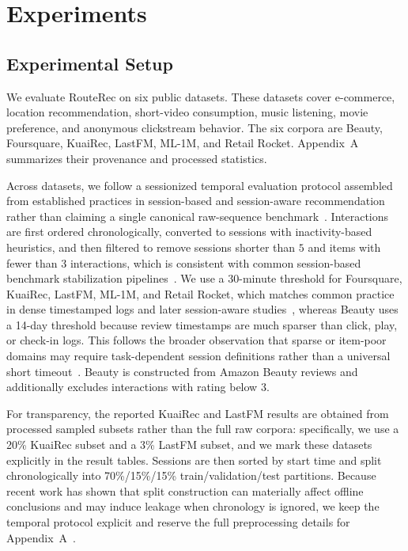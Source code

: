 \documentclass[sigconf,review,anonymous]{acmart}
\begin{document}
\section{Experiments}
\label{sec:experiments}


\subsection{Experimental Setup}
We evaluate RouteRec on six public datasets. These datasets cover e-commerce, location recommendation, short-video consumption, music listening, movie preference, and anonymous clickstream behavior. The six corpora are Beauty, Foursquare, KuaiRec, LastFM, ML-1M, and Retail Rocket. Appendix~A summarizes their provenance and processed statistics.

Across datasets, we follow a sessionized temporal evaluation protocol assembled from established practices in session-based and session-aware recommendation rather than claiming a single canonical raw-sequence benchmark~\cite{jannach2022sessions,quadrana2017hrnn,latifi2021sessionaware}. Interactions are first ordered chronologically, converted to sessions with inactivity-based heuristics, and then filtered to remove sessions shorter than $5$ and items with fewer than $3$ interactions, which is consistent with common session-based benchmark stabilization pipelines~\cite{li2017narm,wu2019srgnn}. We use a 30-minute threshold for Foursquare, KuaiRec, LastFM, ML-1M, and Retail Rocket, which matches common practice in dense timestamped logs and later session-aware studies~\cite{quadrana2017hrnn,lacic2020jobsessions}, whereas Beauty uses a 14-day threshold because review timestamps are much sparser than click, play, or check-in logs. This follows the broader observation that sparse or item-poor domains may require task-dependent session definitions rather than a universal short timeout~\cite{borgbruun2022insurance}. Beauty is constructed from Amazon Beauty reviews and additionally excludes interactions with rating below $3$.

For transparency, the reported KuaiRec and LastFM results are obtained from processed sampled subsets rather than the full raw corpora: specifically, we use a 20\% KuaiRec subset and a 3\% LastFM subset, and we mark these datasets explicitly in the result tables. Sessions are then sorted by start time and split chronologically into 70\%/15\%/15\% train/validation/test partitions. Because recent work has shown that split construction can materially affect offline conclusions and may induce leakage when chronology is ignored, we keep the temporal protocol explicit and reserve the full preprocessing details for Appendix~A~\cite{ji2023leakage,gusak2025timesplit}.
\end{document}
